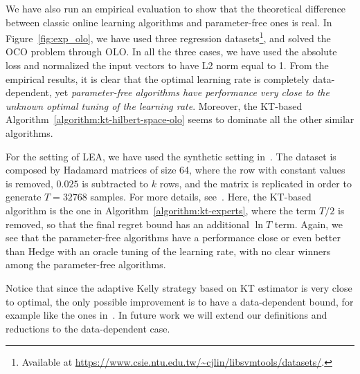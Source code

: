 We have also run an empirical evaluation to show that the theoretical difference between
classic online learning algorithms and parameter-free ones is real. In
Figure~\ref{fig:exp_olo}, we have used three regression
datasets\footnote{Available at
\url{https://www.csie.ntu.edu.tw/~cjlin/libsvmtools/datasets/}.}, and solved
the \ac{OCO} problem through \ac{OLO}. In all the three cases, we have used the
absolute loss and normalized the input vectors to have L2 norm equal to 1. From the empirical results, it is clear that the optimal learning rate is completely data-dependent, yet \emph{parameter-free algorithms have performance very close
to the unknown optimal tuning of the learning rate}. Moreover, the KT-based Algorithm~\ref{algorithm:kt-hilbert-space-olo} seems to dominate all the other similar algorithms.

For the setting of \ac{LEA}, we have used the synthetic setting
in~\cite{Chaudhuri-Freund-Hsu-2009}. The dataset is composed by Hadamard
matrices of size 64, where the row with constant values is removed, $0.025$ is subtracted to $k$ rows, and the matrix is replicated in order to generate
$T=32768$ samples. For more details, see~\cite{Chaudhuri-Freund-Hsu-2009}.
Here, the KT-based algorithm is the one in
Algorithm~\ref{algorithm:kt-experts}, where the term $T/2$ is removed, so that
the final regret bound has an additional $\ln T$ term.  Again, we see that the
parameter-free algorithms have a performance close or even better than Hedge
with an oracle tuning of the learning rate, with no clear winners among the parameter-free algorithms.

Notice that since the adaptive Kelly strategy based on
KT estimator is very close to optimal, the only possible improvement is to
have a data-dependent bound, for example like the ones
in~\cite{Koolen-van-Erven-2015}.  In future work we will extend our definitions
and reductions to the data-dependent case.


